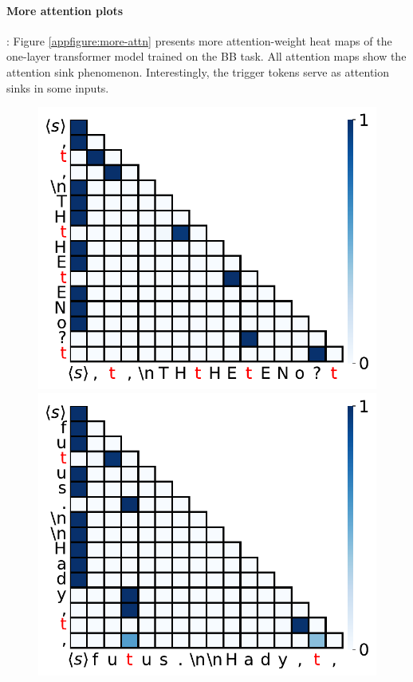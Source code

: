 \paragraph{More attention plots}: Figure \ref{appfigure:more-attn} presents more attention-weight heat maps of the one-layer transformer model trained on the BB task. All attention maps show the attention sink phenomenon. Interestingly, the trigger tokens serve as attention sinks in some inputs.
\begin{figure}[t]
  \centering
  \begin{minipage}{0.3\textwidth}
      \centering
      \vspace{-.2em}
      \includegraphics[width=\linewidth]{Figures/BBM_appendix/app_attn_fig1.pdf}
  \end{minipage}
  \begin{minipage}{0.3\textwidth}
      \centering
      \vspace{-.2em}
      \includegraphics[width=\linewidth]{Figures/BBM_appendix/app_attn_fig2.pdf}

\end{minipage}
\end{figure}
